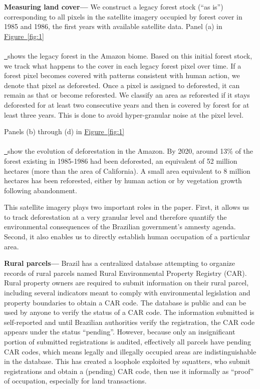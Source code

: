 \documentclass[12pt]{article}
\newcommand*{\figref}[2][]{%
  \hyperref[{fig:#2}]{%
    Figure~\ref*{fig:#2}%
    \ifx\\#1\\%
    \else
      \,#1%
    \fi
  }%
}
\begin{document}
\quad \textbf{Measuring land cover---} We construct a legacy forest stock (``as is'') corresponding to all pixels in the satellite imagery occupied by forest cover in 1985 and 1986, the first years with available satellite data. Panel (a) in \figref{1} shows the legacy forest in the Amazon biome. Based on this initial forest stock, we track what happens to the cover in each legacy forest pixel over time. If a forest pixel becomes covered with patterns consistent with human action, we denote that pixel as deforested. Once a pixel is assigned to deforested, it can remain as that or become reforested. We classify an area as reforested if it stays deforested for at least two consecutive years and then is covered by forest for at least three years. This is done to avoid hyper-granular noise at the pixel level. 
\ 

\quad Panels (b) through (d) in \figref{1} show the evolution of deforestation in the Amazon. By 2020, around 13\% of the forest existing in 1985-1986 had been deforested, an equivalent of 52 million hectares (more than the area of California). A small area equivalent to 8 million hectares has been reforested, either by human action or by vegetation growth following abandonment. 
\ 

\quad This satellite imagery plays two important roles in the paper. First, it allows us to track deforestation at a very granular level and therefore quantify the environmental consequences of the Brazilian government's amnesty agenda. Second, it also enables us to directly establish human occupation of a particular area.
\ 

\quad \textbf{Rural parcels---} Brazil has a centralized database attempting to organize records of rural parcels named Rural Environmental Property Registry (CAR). Rural property owners are required to submit information on their rural parcel, including several indicators meant to comply with environmental legislation and property boundaries to obtain a CAR code. The database is public and can be used by anyone to verify the status of a CAR code. The information submitted is self-reported and until Brazilian authorities verify the registration, the CAR code appears under the status ``pending''. However, because only an insignificant portion of submitted registrations is audited, effectively all parcels have pending CAR codes, which means legally and illegally occupied areas are indistinguishable in the database. This has created a loophole exploited by squatters, who submit registrations and obtain a (pending) CAR code, then use it informally as ``proof'' of occupation, especially for land transactions. 
\ 
\end{document}
